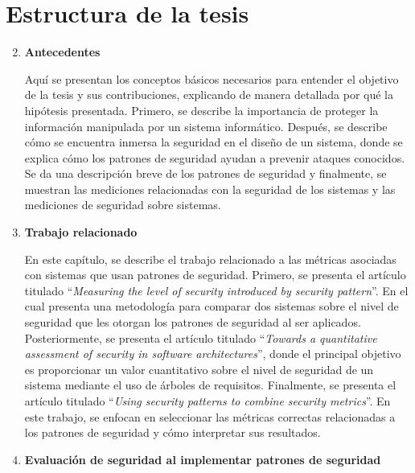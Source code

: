 \section {Estructura de la tesis}


\begin{enumerate}[label=Capítulo \arabic*,leftmargin=*]
	\setcounter{enumi}{1}
	\item \textbf{Antecedentes}
	
		\vspace{0.3cm}
	
		Aquí se presentan los conceptos básicos necesarios para entender el objetivo de la tesis y sus contribuciones, explicando de manera detallada por qué la hipótesis presentada. Primero, se describe la importancia de proteger la información manipulada por un sistema informático. Después, se describe cómo se encuentra inmersa la seguridad en el diseño de un sistema, donde se explica cómo los patrones de seguridad ayudan a prevenir ataques conocidos. Se da una descripción breve de los patrones de seguridad y finalmente, se muestran las mediciones relacionadas con la seguridad de los sistemas y las mediciones de seguridad sobre sistemas.
	\item \textbf{Trabajo relacionado}
	
	\vspace{0.3cm}
	
		En este capítulo, se describe el trabajo relacionado a las métricas asociadas con sistemas que usan patrones de seguridad. Primero, se presenta el artículo titulado ``\textit{Measuring the level of security introduced by security pattern}''. En el cual presenta una metodología para comparar dos sistemas sobre el nivel de seguridad que les otorgan los patrones de seguridad al ser aplicados. Posteriormente, se presenta el artículo titulado ``\textit{Towards a quantitative assessment of security in software architectures}'', donde el principal objetivo es proporcionar un valor cuantitativo sobre el nivel de seguridad de un sistema mediante el uso de árboles de requisitos. Finalmente, se presenta el artículo titulado ``\textit{Using security patterns to combine security metrics}''. En este trabajo, se enfocan en seleccionar las métricas correctas relacionadas a los patrones de seguridad y cómo interpretar sus resultados. 
		  
		\item \textbf{Evaluación de seguridad al implementar patrones de seguridad}
		

\end{enumerate}
